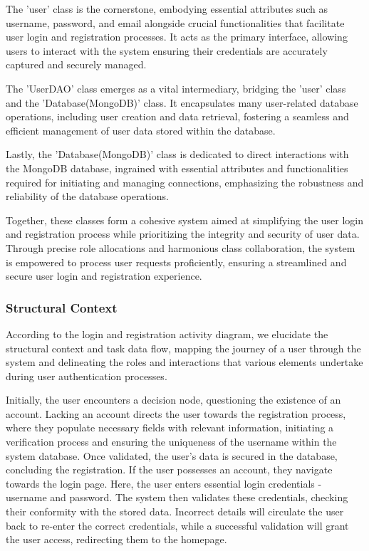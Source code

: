 \documentclass[conference]{IEEEtran}
\begin{document}
The 'user' class is the cornerstone, embodying essential attributes such as username, password, and email alongside crucial functionalities that facilitate user login and registration processes. It acts as the primary interface, allowing users to interact with the system ensuring their credentials are accurately captured and securely managed.

The 'UserDAO' class emerges as a vital intermediary, bridging the 'user' class and the 'Database(MongoDB)' class. It encapsulates many user-related database operations, including user creation and data retrieval, fostering a seamless and efficient management of user data stored within the database.

Lastly, the 'Database(MongoDB)' class is dedicated to direct interactions with the MongoDB database, ingrained with essential attributes and functionalities required for initiating and managing connections, emphasizing the robustness and reliability of the database operations.

Together, these classes form a cohesive system aimed at simplifying the user login and registration process while prioritizing the integrity and security of user data. Through precise role allocations and harmonious class collaboration, the system is empowered to process user requests proficiently, ensuring a streamlined and secure user login and registration experience.

\subsubsection{\textbf{Structural Context }}
\textbf{}

According to the login and registration activity diagram, we elucidate the structural context and task data flow, mapping the journey of a user through the system and delineating the roles and interactions that various elements undertake during user authentication processes.

Initially, the user encounters a decision node, questioning the existence of an account. Lacking an account directs the user towards the registration process, where they populate necessary fields with relevant information, initiating a verification process and ensuring the uniqueness of the username within the system database. Once validated, the user’s data is secured in the database, concluding the registration.
If the user possesses an account, they navigate towards the login page. Here, the user enters essential login credentials - username and password. The system then validates these credentials, checking their conformity with the stored data. Incorrect details will circulate the user back to re-enter the correct credentials, while a successful validation will grant the user access, redirecting them to the homepage.
\end{document}
